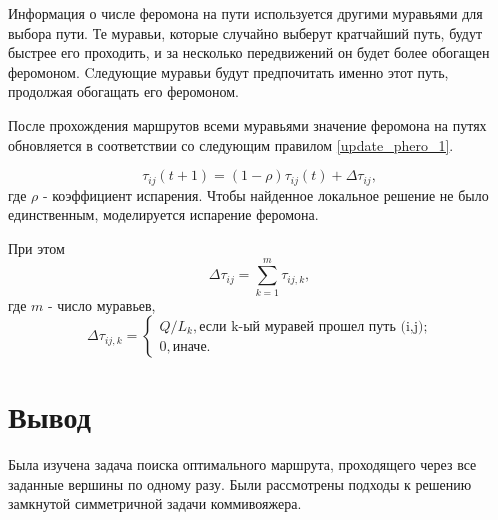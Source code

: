 Информация о числе феромона на пути используется другими муравьями для выбора пути. Те муравьи, которые случайно выберут кратчайший путь, будут быстрее его проходить, и за несколько передвижений он будет более обогащен феромоном. Cледующие муравьи будут предпочитать именно этот путь, продолжая обогащать его феромоном. 

После прохождения маршрутов всеми муравьями значение феромона на путях обновляется в соответствии со следующим правилом \eqref{update_phero_1}.

\begin{equation}
	\label{update_phero_1}
		\tau_{ij}(t+1) = (1-\rho)\tau_{ij}(t) + \Delta \tau_{ij},
\end{equation}
где $\rho$ - коэффициент испарения. Чтобы найденное локальное решение не было единственным, моделируется испарение феромона.

При этом
\begin{equation}
\label{update_phero_2}
 \Delta \tau_{ij} = \sum_{k=1}^m \tau_{ij, k},
\end{equation}
где $m$ - число муравьев,
\begin{equation}
	\label{update_phero_3}
		 \Delta\tau_{ij,k} = \begin{cases}
		Q/L_{k}, \textrm{если k-ый муравей прошел путь (i,j);} \\
		0, \textrm{иначе.}
	\end{cases}
\end{equation}

\section*{Вывод}

Была изучена задача поиска оптимального маршрута, проходящего через все заданные вершины по одному разу. Были рассмотрены подходы к решению замкнутой симметричной задачи коммивояжера.